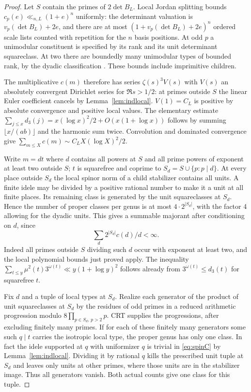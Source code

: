\begin{proof}
Let $S$ contain the primes of $2\det B_L$. Local Jordan splitting bounds $c_p(e)\ll_{n,L}(1+e)^n$ uniformly: the determinant valuation is $v_p(\det B_L)+2e$, and there are at most $(1+v_p(\det B_L)+2e)^n$ ordered scale lists counted with repetition for the $n$ basis positions. At odd $p$ a unimodular constituent is specified by its rank and its unit determinant squareclass. At two there are boundedly many unimodular types of bounded rank, by the dyadic classification \cite{AGM}. These bounds include imprimitive children. 

The multiplicative $c(m)$ therefore has series $\zeta(s)^3 V(s)$ with $V(s)$ an absolutely convergent Dirichlet series for $\Re s>1/2$: at primes outside $S$ the linear Euler coefficient cancels by Lemma~\ref{lem:indlocal}. $V(1)=C_L$ is positive by absolute convergence and positive local values. The elementary estimate $\sum_{j\le x}d_3(j)=x(\log x)^2/2+O(x(1+\log x))$ follows by summing $\lfloor x/(ab)\rfloor$ and the harmonic sum twice. Convolution and dominated convergence give $\sum_{m\le X}c(m)\sim C_L X(\log X)^2/2$.

Write $m=dt$ where $d$ contains all powers at $S$ and all prime powers of exponent at least two outside $S$; $t$ is squarefree and coprime to $S_d=S\cup\{p:p\mid d\}$. At every place outside $S_d$ the local spinor norm of a child stabilizer contains all units. A finite idele may be divided by a positive rational number to make it a unit at all finite places. Its remaining class is generated by the unit squareclasses at $S_d$. Hence the number of proper classes per genus is at most $4\cdot2^{|S_d|}$, with the factor 4 allowing for the dyadic units. This gives a summable majorant after conditioning on $d$, since
\[
 \sum_{d}2^{|S_d|}c(d)/d<\infty .
\]
Indeed all primes outside $S$ dividing such $d$ occur with exponent at least two, and the local polynomial bounds just proved apply. The inequality $\sum_{t\le y}\mu^2(t)3^{\omega(t)}\ll y(1+\log y)^2$ follows already from $3^{\omega(t)}\le d_3(t)$ for squarefree $t$.

Fix $d$ and a tuple of local types at $S_d$. Realize each generator of the product of unit squareclasses at $S_d$ by the residues of odd primes in a reduced arithmetic progression modulo $8\prod_{p\in S_d,\,p>2}p$. CRT supplies the progressions, after excluding finitely many primes. If for each of these finitely many generators some such $q\mid t$ carries the isotropic local type, the proper genus has only one class. In fact the idele supported at $q$ with uniformizer $q$ is trivial in \eqref{eq:spinC} by Lemma~\ref{lem:indlocal}. Dividing it by rational $q$ kills the prescribed unit tuple at $S_d$ and leaves only units at other primes, where those units are in the stabilizer image. Thus all generators vanish. Both actual counts give one class for this tuple.


\end{proof}
